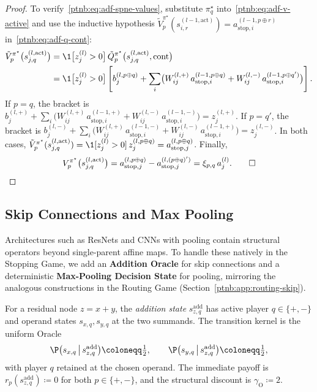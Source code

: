 \begin{proof}
To verify~\eqref{ptnb:eq:adf-spne-values}, substitute $\pi_q^\star$ into~\eqref{ptnb:eq:adf-v-active} and use
the inductive hypothesis $\tilde{V}_p^{\pi^\star}(s_{i,r}^{(l-1, \mathrm{act})}) =
    a_{\mathrm{stop},i}^{(l-1, p \oplus r)}$ in~\eqref{ptnb:eq:adf-q-cont}:
\begin{align}
    \tilde{V}_p^{\pi^\star}\bigl(s_{j,q}^{(l, \mathrm{act})}\bigr)
    &= \1\bigl[z_j^{(l)} > 0\bigr]\, \tilde{Q}_p^{\pi^\star}\bigl(s_{j,q}^{(l, \mathrm{act})},
    \mathrm{cont}\bigr) \\
    &= \1\bigl[z_j^{(l)} > 0\bigr] \left[ b_j^{(l, p \oplus q)} + \sum_i \bigl( W_{ij}^{(l,+)}\,
    a_{\mathrm{stop},i}^{(l-1, p \oplus q)} + W_{ij}^{(l,-)}\, a_{\mathrm{stop},i}^{(l-1, p \oplus q')}
    \bigr) \right].
\end{align}
If $p=q$, the bracket is $b_j^{(l,+)} + \sum_i \bigl( W_{ij}^{(l,+)}\,
    a_{\mathrm{stop},i}^{(l-1,+)} + W_{ij}^{(l,-)}\, a_{\mathrm{stop},i}^{(l-1,-)} \bigr) =
    z_j^{(l,+)}$.
If $p=q'$, the bracket is $b_j^{(l,-)} + \sum_i \bigl( W_{ij}^{(l,+)}\,
    a_{\mathrm{stop},i}^{(l-1,-)} + W_{ij}^{(l,-)}\, a_{\mathrm{stop},i}^{(l-1,+)} \bigr) =
    z_j^{(l,-)}$.
In both cases, $\tilde{V}_p^{\pi^\star}(s_{j,q}^{(l, \mathrm{act})}) = \1[z_j^{(l)} > 0]\, z_j^{(l,
    p \oplus q)} = a_{\mathrm{stop},j}^{(l, p \oplus q)}$. Finally,
\begin{align}
    V_p^{\pi^\star}\bigl(s_{j,q}^{(l, \mathrm{act})}\bigr)
    = a_{\mathrm{stop},j}^{(l, p \oplus q)} - a_{\mathrm{stop},j}^{(l, (p \oplus q)')}
    = \xi_{p,q}\, a_j^{(l)}.
    \qed
\end{align}
\end{proof}

\subsection{Skip Connections and Max Pooling}\label{ptnb:app:skip-connections}

Architectures such as ResNets and CNNs with pooling contain structural operators beyond
single-parent affine maps. To handle these natively in the Stopping Game, we add an
\textbf{Addition Oracle} for skip connections and a deterministic \textbf{Max-Pooling Decision
State} for pooling, mirroring the analogous constructions in the Routing Game
(Section~\ref{ptnb:app:routing-skip}).

\begin{definition}\label{ptnb:def:addition-subgame}
For a residual node $z = x + y$, the \emph{addition state} $s_{z,q}^{\mathrm{add}}$ has active
player $q \in \{+,-\}$ and operand states $s_{x,q}, s_{y,q}$ at the two summands. The transition
kernel is the uniform Oracle
\begin{align}
    \P\bigl(s_{x,q} \,\big|\, s_{z,q}^{\mathrm{add}}\bigr) \coloneqq \tfrac{1}{2},
    \qquad
    \P\bigl(s_{y,q} \,\big|\, s_{z,q}^{\mathrm{add}}\bigr) \coloneqq \tfrac{1}{2},
\end{align}
with player $q$ retained at the chosen operand. The immediate payoff is
$r_p(s_{z,q}^{\mathrm{add}}) \coloneqq 0$ for both $p \in \{+,-\}$, and the structural discount is
$\gamma_{\mathrm{O}} \coloneqq 2$.
\end{definition}

